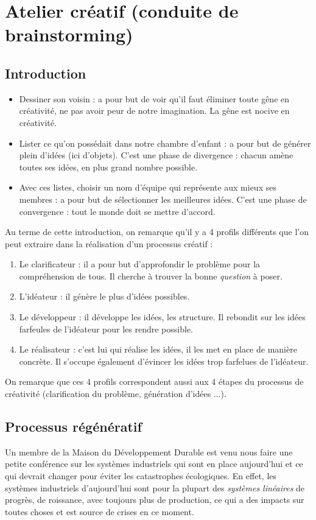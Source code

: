 \section{Atelier créatif (conduite de brainstorming)}
\subsection{Introduction}
\begin{itemize}
	\item Dessiner son voisin : a pour but de voir qu'il faut éliminer toute gêne en
	créativité, ne pas avoir peur de notre imagination. La gêne est nocive en créativité.
	\item Lister ce qu'on possédait dans notre chambre d'enfant : a pour but de générer
	plein d'idées (ici d'objets). C'est une phase de divergence : chacun amène toutes
	ses idées, en plus grand nombre possible.
	\item Avec ces listes, choisir un nom d'équipe qui représente aux mieux ses membres
	: a pour but de sélectionner les meilleures idées. C'est une phase de convergence :
	tout le monde doit se mettre d'accord.
\end{itemize}

Au terme de cette introduction, on remarque qu'il y a 4 profils différents que l'on peut
extraire dans la réalisation d'un processus créatif :

\begin{enumerate}
	\item Le clarificateur : il a pour but d'approfondir le problème pour la compréhension de tous.
	Il cherche à trouver la bonne \textit{question} à poser.
	\item L'idéateur : il génère le plus d'idées possibles.
	\item Le développeur : il développe les idées, les structure. Il rebondit sur les idées farfeules
	de l'idéateur pour les rendre possible.
	\item Le réalisateur : c'est lui qui réalise les idées, il les met en place de manière concrète.
	Il s'occupe également d'évincer les idées trop farfelues de l'idéateur.
\end{enumerate}

On remarque que ces 4 profils correspondent aussi aux 4 étapes du processus de créativité
(clarification du problème, génération d'idées ...).

\subsection{Processus régénératif}
Un membre de la Maison du Développement Durable est venu nous faire une petite conférence sur
les systèmes industriels qui sont en place aujourd'hui et ce qui devrait changer pour éviter
les catastrophes écologiques. En effet, les systèmes industriels d'aujourd'hui sont pour la plupart
des \textit{systèmes linéaires} de progrès, de roissance, avec toujours plus de production,
ce qui a des impacts sur toutes choses et est source de crises en ce moment.

